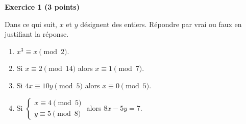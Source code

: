 \documentclass{article}
\begin{document}
\textbf{Exercice 1 (3 points)}

Dans ce qui suit, $x$ et $y$ désignent des entiers.
Répondre par vrai ou faux en justifiant la réponse.

\begin{enumerate}[label=\alph*)]
    \item $x^3 \equiv x \pmod{2}$.
    \item Si $x \equiv 2 \pmod{14}$ alors $x \equiv 1 \pmod{7}$.
    \item Si $4x \equiv 10y \pmod{5}$ alors $x \equiv 0 \pmod{5}$.
    \item Si $\begin{cases} x \equiv 4 \pmod{5} \\ y \equiv 5 \pmod{8} \end{cases}$ alors $8x - 5y = 7$.
\end{enumerate}
\end{document}
